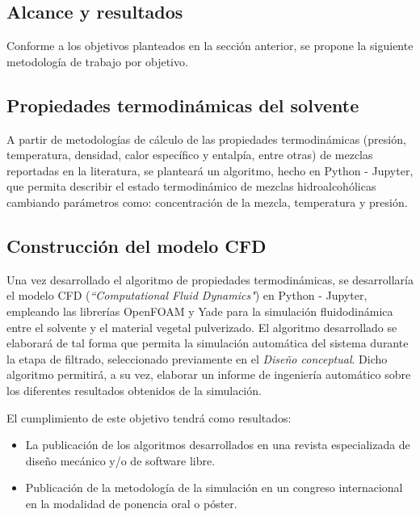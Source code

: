 \begin{center}
	\section{Alcance y resultados}
\end{center}

\noindent
\justify

Conforme a los objetivos planteados en la secci\'on anterior, se propone la siguiente metodolog\'ia de trabajo por objetivo.

\noindent
\justify

\subsection{Propiedades termodin\'amicas del solvente}

\noindent
\justify

A partir de metodolog\'ias de c\'alculo de las propiedades termodin\'amicas (presi\'on, temperatura, densidad, calor espec\'ifico y entalp\'ia, entre otras) de mezclas reportadas en la literatura, se plantear\'a un algoritmo, hecho en Python - Jupyter, que permita describir el estado termodin\'amico de mezclas hidroalcoh\'olicas cambiando par\'ametros como: concentraci\'on de la mezcla, temperatura y presi\'on.

\subsection{Construcci\'on del modelo CFD}

\noindent
\justify

Una vez desarrollado el algoritmo de propiedades termodin\'amicas, se desarrollar\'ia el modelo CFD (\textit{``Computational Fluid Dynamics"}) en Python - Jupyter, empleando las librer\'ias OpenFOAM y Yade para la simulaci\'on fluidodin\'amica entre el solvente y el material vegetal pulverizado. El algoritmo desarrollado se elaborar\'a de tal forma que permita la simulaci\'on autom\'atica del sistema durante la etapa de filtrado, seleccionado previamente en el \textit{Dise\~no conceptual}. Dicho algoritmo permitir\'a, a su vez, elaborar un informe de ingenier\'ia autom\'atico sobre los diferentes resultados obtenidos de la simulaci\'on.

\noindent
\justify

El cumplimiento de este objetivo tendr\'a como resultados:

\begin{itemize}
	\item La publicaci\'on de los algoritmos desarrollados en una revista especializada de dise\~no mec\'anico y/o de software libre.
	\item Publicaci\'on de la metodolog\'ia de la simulaci\'on en un congreso internacional en la modalidad de ponencia oral o p\'oster.
\end{itemize}

